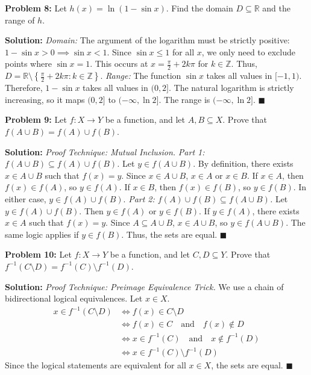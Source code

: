 \documentclass[11pt, letterpaper]{article}
\theoremstyle{definition}
\theoremstyle{remark}
\newcommand{\R}{\mathbb{R}}
\newcommand{\Z}{\mathbb{Z}}
\begin{document}
\vspace{1em}
\textbf{Problem 8:} Let $h(x) = \ln(1 - \sin x)$. Find the domain $D \subseteq \R$ and the range of $h$.

\textbf{Solution:}
\textit{Domain:} The argument of the logarithm must be strictly positive: $1 - \sin x > 0 \implies \sin x < 1$. Since $\sin x \le 1$ for all $x$, we only need to exclude points where $\sin x = 1$. This occurs at $x = \frac{\pi}{2} + 2k\pi$ for $k \in \Z$. Thus, $D = \R \setminus \left\{ \frac{\pi}{2} + 2k\pi : k \in \Z \right\}$.
\textit{Range:} The function $\sin x$ takes all values in $[-1, 1)$. Therefore, $1 - \sin x$ takes all values in $(0, 2]$. The natural logarithm is strictly increasing, so it maps $(0, 2]$ to $(-\infty, \ln 2]$. The range is $(-\infty, \ln 2]$. \hfill $\blacksquare$

\vspace{1em}
\textbf{Problem 9:} Let $f: X \to Y$ be a function, and let $A, B \subseteq X$. Prove that $f(A \cup B) = f(A) \cup f(B)$.

\textbf{Solution:}
\textit{Proof Technique: Mutual Inclusion.}
\textit{Part 1: $f(A \cup B) \subseteq f(A) \cup f(B)$.} Let $y \in f(A \cup B)$. By definition, there exists $x \in A \cup B$ such that $f(x) = y$. Since $x \in A \cup B$, $x \in A$ or $x \in B$. If $x \in A$, then $f(x) \in f(A)$, so $y \in f(A)$. If $x \in B$, then $f(x) \in f(B)$, so $y \in f(B)$. In either case, $y \in f(A) \cup f(B)$.
\textit{Part 2: $f(A) \cup f(B) \subseteq f(A \cup B)$.} Let $y \in f(A) \cup f(B)$. Then $y \in f(A)$ or $y \in f(B)$. If $y \in f(A)$, there exists $x \in A$ such that $f(x) = y$. Since $A \subseteq A \cup B$, $x \in A \cup B$, so $y \in f(A \cup B)$. The same logic applies if $y \in f(B)$. Thus, the sets are equal. \hfill $\blacksquare$

\vspace{1em}
\textbf{Problem 10:} Let $f: X \to Y$ be a function, and let $C, D \subseteq Y$. Prove that $f^{-1}(C \setminus D) = f^{-1}(C) \setminus f^{-1}(D)$.

\textbf{Solution:}
\textit{Proof Technique: Preimage Equivalence Trick.}
We use a chain of bidirectional logical equivalences. Let $x \in X$.
\begin{align*}
x \in f^{-1}(C \setminus D) &\iff f(x) \in C \setminus D \\
&\iff f(x) \in C \quad \text{and} \quad f(x) \notin D \\
&\iff x \in f^{-1}(C) \quad \text{and} \quad x \notin f^{-1}(D) \\
&\iff x \in f^{-1}(C) \setminus f^{-1}(D)
\end{align*}
Since the logical statements are equivalent for all $x \in X$, the sets are equal. \hfill $\blacksquare$
\end{document}
